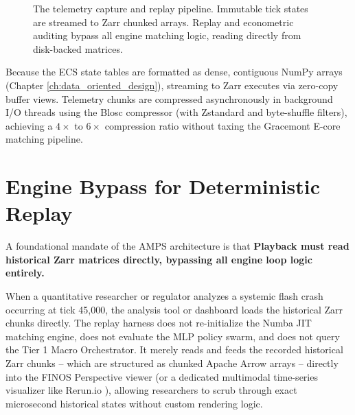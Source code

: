 \begin{figure}[htbp]
\centering
{}
\caption{The telemetry capture and replay pipeline. Immutable tick states are streamed to Zarr chunked arrays. Replay and econometric auditing bypass all engine matching logic, reading directly from disk-backed matrices.}
\label{fig:zarr_pipeline}
\end{figure}

Because the ECS state tables are formatted as dense, contiguous NumPy arrays (Chapter \ref{ch:data_oriented_design}), streaming to Zarr executes via zero-copy buffer views. Telemetry chunks are compressed asynchronously in background I/O threads using the Blosc compressor (with Zstandard and byte-shuffle filters), achieving a $4\times$ to $6\times$ compression ratio without taxing the Gracemont E-core matching pipeline.

\section{Engine Bypass for Deterministic Replay}

A foundational mandate of the AMPS architecture is that \textbf{Playback must read historical Zarr matrices directly, bypassing all engine loop logic entirely.}

When a quantitative researcher or regulator analyzes a systemic flash crash occurring at tick 45,000, the analysis tool or dashboard loads the historical Zarr chunks directly. The replay harness does not re-initialize the Numba JIT matching engine, does not evaluate the MLP policy swarm, and does not query the Tier 1 Macro Orchestrator. It merely reads and feeds the recorded historical Zarr chunks -- which are structured as chunked Apache Arrow arrays -- directly into the FINOS Perspective viewer (or a dedicated multimodal time-series visualizer like Rerun.io \cite{finos_perspective, rerun_io}), allowing researchers to scrub through exact microsecond historical states without custom rendering logic.

